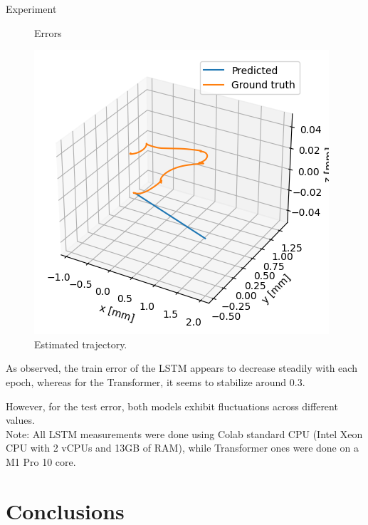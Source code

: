\documentclass[aspectratio=169,t,xcolor=table]{beamer}
\begin{document}
\begin{frame}[allowframebreaks]{Experiment}
\begin{figure}[!htb]
\begin{center}
\begin{minipage}{0.45\textwidth}
            \caption{Errors}\label{graph3}
        \end{minipage}
        \hfill
        \begin{minipage}{0.45\textwidth}
            \centering
            \includegraphics[width=\linewidth]{../outputs/transformerTrajectory.png}
            \caption{Estimated trajectory.}\label{graph4}
        \end{minipage}
    \end{center}
\end{figure}

As observed, the train error of the LSTM appears to decrease steadily with each epoch, whereas for the Transformer, it seems to stabilize around $0.3$. \\
\vspace{5mm}

However, for the test error, both models exhibit fluctuations across different values.\\
\vspace{5mm}
Note: All LSTM measurements were done using Colab standard CPU (Intel Xeon CPU with 2 vCPUs and 13GB of RAM), while Transformer ones were done on a M1 Pro 10 core.\\
\end{frame}

\section{Conclusions}
\end{document}
